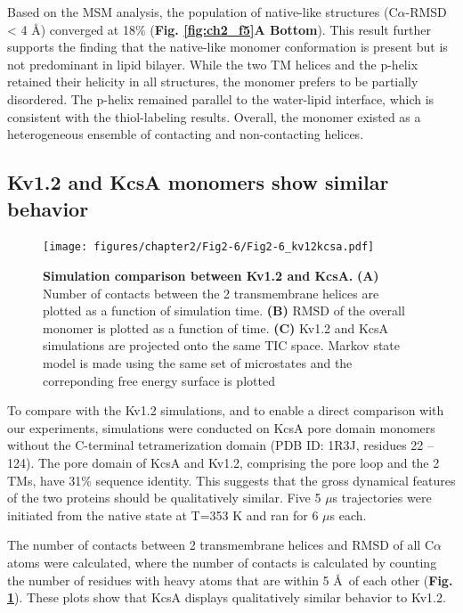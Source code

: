 Based on the MSM analysis, the population of native-like structures (C$\alpha$-RMSD < 4 Å) converged at 18\% (\textbf{Fig. \ref{fig:ch2_f5}A Bottom}). This result further supports the finding that the native-like monomer conformation is present but is not predominant in lipid bilayer. While the two TM helices and the p-helix retained their helicity in all structures, the monomer prefers to be partially disordered. The p-helix remained parallel to the water-lipid interface, which is consistent with the thiol-labeling results. \citep{gajewski2011} Overall, the monomer existed as a heterogeneous ensemble of contacting and non-contacting helices.

\subsection{Kv1.2 and KcsA monomers show similar behavior}

\begin{figure}[!ht]
\begin{center}
	\texttt{[image: figures/chapter2/Fig2-6/Fig2-6\_kv12kcsa.pdf]}
\end{center}
	\caption{\textbf{Simulation comparison between Kv1.2 and KcsA.} \textbf{(A)} Number of contacts between the 2 transmembrane helices are plotted as a function of simulation time. \textbf{(B)} RMSD of the overall monomer is plotted as a function of time. \textbf{(C)} Kv1.2 and KcsA simulations are projected onto the same TIC space. Markov state model is made using the same set of microstates and the correponding free energy surface is plotted}
	\label{fig:ch2_f6}
\end{figure}

To compare with the Kv1.2 simulations, and to enable a direct comparison with our experiments, simulations were conducted on KcsA pore domain monomers without the C-terminal tetramerization domain (PDB ID: 1R3J, residues 22 -- 124). The pore domain of KcsA and Kv1.2, comprising the pore loop and the 2 TMs, have 31\% sequence identity. This suggests that the gross dynamical features of the two proteins should be qualitatively similar. Five 5 $\mu$s trajectories were initiated from the native state at T=353 K and ran for 6 $\mu$s each. 

The number of contacts between 2 transmembrane helices and RMSD of all C$\alpha$ atoms were calculated, where the number of contacts is calculated by counting the number of residues with heavy atoms that are within 5 \AA \ of each other (\textbf{Fig. \ref{fig:ch2_f6}}). These plots show that KcsA displays qualitatively similar behavior to Kv1.2.

